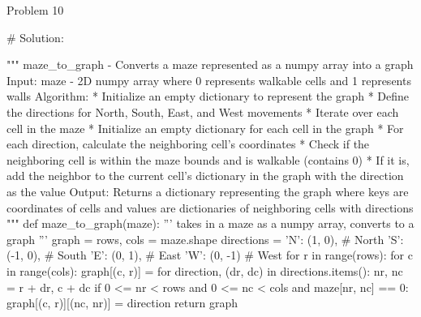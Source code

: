 \begin{problem}{Problem 10}
\begin{highlight}[Solution]
\begin{code}[Python]
    # Solution:
    
    """ maze_to_graph - Converts a maze represented as a numpy array into a graph
        Input:
            maze - 2D numpy array where 0 represents walkable cells and 1 represents walls
        Algorithm:
            * Initialize an empty dictionary to represent the graph
            * Define the directions for North, South, East, and West movements
            * Iterate over each cell in the maze
                * Initialize an empty dictionary for each cell in the graph
                * For each direction, calculate the neighboring cell's coordinates
                * Check if the neighboring cell is within the maze bounds and is walkable (contains 0)
                    * If it is, add the neighbor to the current cell's dictionary in the graph with the direction as the value
        Output:
            Returns a dictionary representing the graph where keys are coordinates of cells and values are dictionaries
            of neighboring cells with directions
    """
    def maze_to_graph(maze):
        ''' takes in a maze as a numpy array, converts to a graph '''
        graph = {}
        rows, cols = maze.shape
        directions = {
            'N': (1, 0),  # North
            'S': (-1, 0),   # South
            'E': (0, 1),   # East
            'W': (0, -1)   # West
        }
        for r in range(rows):
            for c in range(cols):
                graph[(c, r)] = {}
                for direction, (dr, dc) in directions.items():
                    nr, nc = r + dr, c + dc
                    if 0 <= nr < rows and 0 <= nc < cols and maze[nr, nc] == 0:
                        graph[(c, r)][(nc, nr)] = direction
        return graph
    \end{code}
    \end{highlight}
\end{problem}